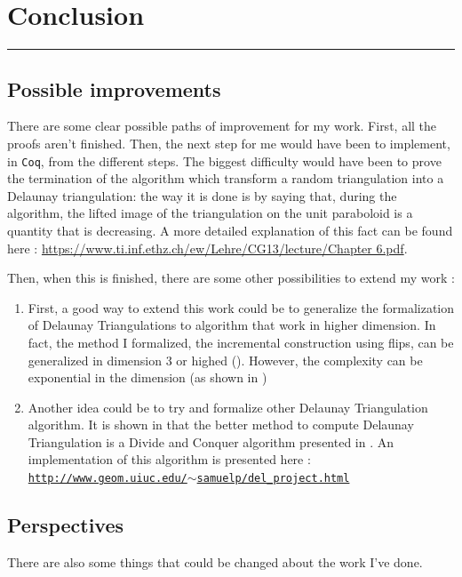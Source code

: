\documentclass[a4paper,10pt]{article}
\begin{document}
\section{Conclusion}
\rule{\linewidth}{0.5pt}
\subsection{Possible improvements}

There are some clear possible paths of improvement for my work. First, all the proofs aren't finished. Then, the next step for me would have been to implement, in {\tt Coq}, from the different steps. The biggest difficulty would have been to prove the termination of the algorithm which transform a random triangulation into a Delaunay triangulation: the way it is done is by saying that, during the algorithm, the lifted image of the triangulation on the unit paraboloid is a quantity that is decreasing. A more detailed explanation of this fact can be found here :
\href{https://www.ti.inf.ethz.ch/ew/Lehre/CG13/lecture/Chapter 6.pdf}{https://www.ti.inf.ethz.ch/ew/Lehre/CG13/lecture/Chapter 6.pdf}.

Then, when this is finished, there are some other possibilities to extend my work :
\begin{enumerate}
\item First, a good way to extend this work could be to generalize the formalization of Delaunay Triangulations to algorithm that work in higher dimension. In fact, the method I formalized, the incremental construction using flips, can be generalized in dimension 3 or highed (\cite{CompGeoAlgo}). However, the complexity can be exponential in the dimension (as shown in \cite{IncrementalDimension})
\item Another idea could be to try and formalize other Delaunay Triangulation algorithm. It is shown in \cite{Comparison} that the better method to compute Delaunay Triangulation is a Divide and Conquer algorithm presented in \cite{AlgoDivide}. An implementation of this algorithm is presented here :\\
  \href{http://www.geom.uiuc.edu/~samuelp/del_project.html}{{\tt http://www.geom.uiuc.edu/$\sim$samuelp/del\_project.html}}
\end{enumerate}


\subsection{Perspectives}

There are also some things that could be changed about the work I've done.
\end{document}

